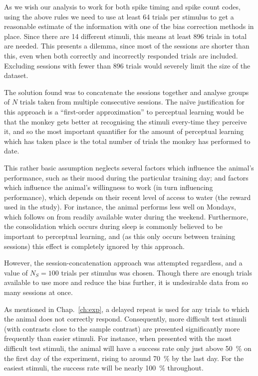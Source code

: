 As we wish our analysis to work for both spike timing and spike count codes, using the above rules we need to use at least 64 trials per stimulus to get a reasonable estimate of the information with one of the bias correction methods in place.
Since there are 14 different stimuli, this means at least 896 trials in total are needed.
This presents a dilemma, since most of the sessions are shorter than this, even when both correctly and incorrectly responded trials are included.
Excluding sessions with fewer than 896 trials would severely limit the size of the dataset.

The solution found was to concatenate the sessions together and analyse groups of $N$ trials taken from multiple consecutive sessions.
The na\"{i}ve justification for this approach is a ``first-order approximation'' to perceptual learning would be that the monkey gets better at recognising the stimuli every-time they perceive it, and so the most important quantifier for the amount of perceptual learning which has taken place is the total number of trials the monkey has performed to date.

This rather basic assumption neglects several factors which influence the animal's performance, such as their mood during the particular training day; and factors which influence the animal's willingness to work (in turn influencing performance), which depends on their recent level of access to water (the reward used in the study).
For instance, the animal performs less well on Mondays, which follows on from readily available water during the weekend.
Furthermore, the consolidation which occurs during sleep is commonly believed to be important to perceptual learning, and (as this only occurs between training sessions) this effect is completely ignored by this approach.

However, the session-concatenation approach was attempted regardless, and a value of $N_S = 100$ trials per stimulus was chosen.
Though there are enough trials available to use more and reduce the bias further, it is undesirable data from so many sessions at once.

As mentioned in Chap.~\ref{ch:exp}, a delayed repeat is used for any trials to which the animal does not correctly respond.
Consequently, more difficult test stimuli (with contrasts close to the sample contrast) are presented significantly more frequently than easier stimuli.
For instance, when presented with the most difficult test stimuli, the animal will have a success rate only just above \SI{50}{\percent} on the first day of the experiment, rising to around \SI{70}{\percent} by the last day.
For the easiest stimuli, the success rate will be nearly \SI{100}{\percent} throughout.

